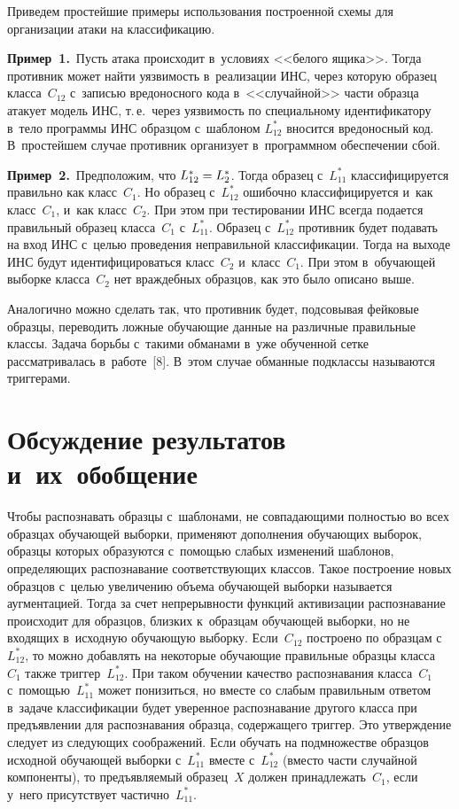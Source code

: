\begin{multicols}{2}
  Приведем простейшие примеры использования построенной схемы для 
организации атаки на классификацию.
  
  \smallskip
  
  \noindent
  \textbf{Пример~1.}\ Пусть атака происходит в~условиях <<белого ящика>>. 
Тогда противник может найти уязвимость в~реализации ИНС, через которую 
образец класса~$C_{12}$ с~за\-писью вредоносного кода в~<<случайной>> части 
образца атакует модель ИНС, т.\,е.\ через уязвимость по специальному 
идентификатору в~тело программы ИНС образцом с~шаблоном $L_{12}^*$ 
вносится вредоносный код. В~простейшем случае противник организует в~программном обеспечении 
сбой.
  
  \smallskip
  
  \noindent
  \textbf{Пример~2.}\ Предположим, что $L_{12}^*\hm= L_2^*$. Тогда образец 
с~$L_{11}^*$ классифицируется правильно как класс~$C_1$. Но образец 
с~$L_{12}^*$ ошибочно классифицируется и~как класс~$C_1$, и~как 
класс~$C_2$. При этом при тестировании ИНС всегда подается правильный 
образец класса~$C_1$ с~$L_{11}^*$. Образец с~$L_{12}^*$ противник будет 
подавать на вход ИНС с~целью проведения неправильной классификации. Тогда 
на выходе ИНС будут идентифицироваться класс~$C_2$ и~класс~$C_1$. При этом в~обучающей выборке класса~$C_2$ нет враждебных образцов, как это было 
описано выше.
  
  Аналогично можно сделать так, что противник будет, подсовывая фейковые 
образцы, переводить ложные обуча\-ющие данные на различные правильные 
классы. Задача борьбы с~такими обманами в~уже обученной сетке рассматривалась 
в~работе~[8]. В~этом случае обманные подклассы называются триггерами.
  
  \section{Обсуждение результатов и~их~обобщение}
  
  Чтобы распознавать образцы с~шаблонами, не совпадающими полностью во 
всех образцах обуча\-ющей выборки, применяют дополнения обуча\-ющих выборок, 
образцы которых образуются \mbox{с~по\-мощью} слабых изменений шаблонов, 
опре\-де\-ля\-ющих распознавание соответствующих классов. Такое построение новых 
образцов с~целью увеличению объема обуча\-ющей выборки называется 
аугментацией. Тогда за счет непрерывности функций активизации распознавание 
происходит для образцов, близ\-ких к~образцам обуча\-ющей выборки, но не 
входящих в~исходную обуча\-ющую выборку. Если~$C_{12}$ построено по 
образцам с~$L^*_{12}$, то можно добавлять на некоторые обуча\-ющие 
правильные образцы класса~$C_1$ также триггер~$L^*_{12}$.
  При таком обучении качество распознавания класса~$C_1$  
с~по\-мощью~$L_{11}^*$ может понизиться, но вместе со слабым правильным 
ответом в~задаче классификации будет уверенное распознавание другого класса 
при предъявлении для распознавания образца, содержащего триггер. Это 
утверждение следует из сле\-ду\-ющих соображений. Если обучать на подмножестве 
образцов исходной обучающей выборки с~$L_{11}^*$ вмес\-те с~$L_{12}^*$ 
(вместо части случайной компоненты), то предъявляемый образец~$X$ должен 
принадлежать~$C_1$, если у~него присутствует частично~$L_{11}^*$.
  

\end{multicols}
